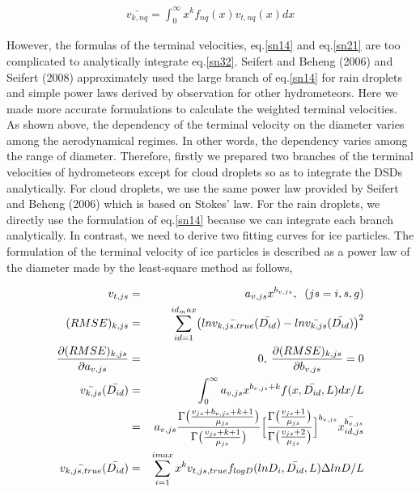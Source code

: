 \begin{eqnarray}
\bar{v_{k,nq}}=\int_{0}^{\infty}x^{k}f_{nq}(x)v_{t,nq}(x)dx
\label{sn32}
\end{eqnarray}

However, the formulas of the terminal velocities, eq.\ref{sn14} and eq.\ref{sn21} are too complicated to analytically integrate eq.\ref{sn32}. Seifert and Beheng (2006) and Seifert (2008) approximately used the large branch of eq.\ref{sn14} for rain droplets and simple power laws derived by observation for other hydrometeors. Here we made more accurate formulations to calculate the weighted terminal velocities.\\
As shown above, the dependency of the terminal velocity on the diameter varies among the aerodynamical regimes. In other words, the dependency varies among the range of diameter. Therefore, firstly we prepared two branches of the terminal velocities of hydrometeors except for cloud droplets so as to integrate the DSDs analytically. For cloud droplets, we use the same power law provided by Seifert and Beheng (2006) which is based on Stokes’ law. For the rain droplets, we directly use the formulation of eq.\ref{sn14} because we can integrate each branch analytically. In contrast, we need to derive two fitting curves for ice particles. The formulation of the terminal velocity of ice particles is described as a power law of the diameter made by the least-square method as follows,

\begin{eqnarray}
v_{t,js}&=&a_{v,js}x^{b_{v,js}},\;\;(js=i,s,g)\label{sn33}\\
(RMSE)_{k,js}&=&\sum_{id=1}^{id_max}\bigl(ln\bar{v_{k,js,true}}(\bar{D_{id}})-ln\bar{v_{k,js}}(\bar{D_{id}})\bigr)^{2}\label{sn34}\\
\frac{\partial(RMSE)_{k,js}}{\partial a_{v,js}}&=&0,\:\frac{\partial (RMSE)_{k,js}}{\partial b_{v,js}}=0\nonumber\\
\bar{v_{k,js}}(\bar{D_{id}})&=&\int_{0}^{\infty}a_{v,js}x^{b_{v,js}+k}f(x,\bar{D_{id}},L)dx/L\nonumber\\
&=&a_{v,js}\frac{\Gamma\bigl(\frac{v_{js}+b_{v,js}+k+1}{\mu_{js}}\bigr)}{\Gamma\bigl(\frac{v_{js}+k+1}{\mu_{js}}\bigr)}
\Bigl[\frac{\Gamma\bigl(\frac{v_{js}+1}{\mu_{js}}\bigr)}{\Gamma\bigl(\frac{v_{js}+2}{\mu_{js}}\bigr)}\Bigr]^{b_{v,js}}\bar{x_{id,js}^{b_{v,js}}}\label{sn35}\\
\bar{v_{k,js,true}}(\bar{D_{id}})&=&\sum_{i=1}^{imax}x^{k}v_{t,js,true}f_{logD}(lnD_{i},\bar{D_{id}},L)\Delta ln D/L\nonumber
\end{eqnarray}

